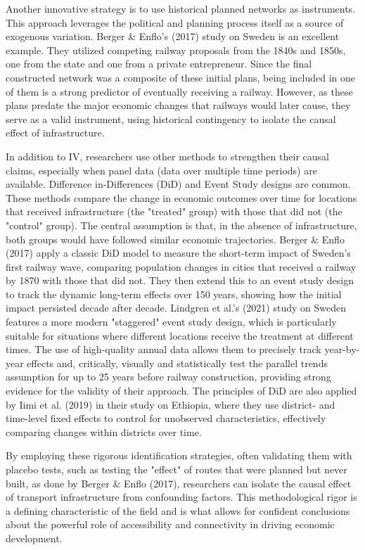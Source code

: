 \documentclass[12pt, a4paper]{article}
\begin{document}
Another innovative strategy is to use historical planned networks as instruments. This approach leverages the political and planning process itself as a source of exogenous variation. Berger & Enflo's (2017) study on Sweden is an excellent example. They utilized competing railway proposals from the 1840s and 1850s, one from the state and one from a private entrepreneur. Since the final constructed network was a composite of these initial plans, being included in one of them is a strong predictor of eventually receiving a railway. However, as these plans predate the major economic changes that railways would later cause, they serve as a valid instrument, using historical contingency to isolate the causal effect of infrastructure. 


In addition to IV, researchers use other methods to strengthen their causal claims, especially when panel data (data over multiple time periods) are available. Difference in-Differences (DiD) and Event Study designs are common. These methods compare the change in economic outcomes over time for locations that received infrastructure (the "treated" group) with those that did not (the "control" group). The central assumption is that, in the absence of infrastructure, both groups would have followed similar economic trajectories. Berger & Enflo (2017) apply a classic DiD model to measure the short-term impact of Sweden's first railway wave, comparing population changes in cities that received a railway by 1870 with those that did not. They then extend this to an event study design to track the dynamic long-term effects over 150 years, showing how the initial impact persisted decade after decade. Lindgren et al.'s (2021) study on Sweden features a more modern "staggered" event study design, which is particularly suitable for situations where different locations receive the treatment at different times. The use of high-quality annual data allows them to precisely track year-by-year effects and, critically, visually and statistically test the parallel trends assumption for up to 25 years before railway construction, providing strong evidence for the validity of their approach. The principles of DiD are also applied by Iimi et al. (2019) in their study on Ethiopia, where they use district- and time-level fixed effects to control for unobserved characteristics, effectively comparing changes within districts over time. 


By employing these rigorous identification strategies, often validating them with placebo tests, such as testing the "effect" of routes that were planned but never built, as done by Berger \& Enflo (2017),  researchers can isolate the causal effect of transport infrastructure from confounding factors. This methodological rigor is a defining characteristic of the field and is what allows for confident conclusions about the powerful role of accessibility and connectivity in driving economic development. 
\end{document}
